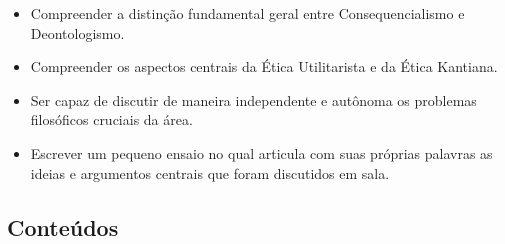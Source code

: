 \documentclass[
	article,			%
	12pt,				%
	twoside,			%
	a4paper,			%
	english,			%
	brazil,				%
	sumario=tradicional
]{plano}
\begin{document}
\begin{itemize}

	\item Compreender a distinção fundamental geral entre Consequencialismo e Deontologismo.
	\item Compreender os aspectos centrais da Ética Utilitarista e da Ética Kantiana.

	\newpage

	\item Ser capaz de discutir de maneira independente e autônoma os problemas filosóficos cruciais da área.

	\item  Escrever um  pequeno ensaio no qual articula com suas próprias palavras as ideias e argumentos centrais que foram discutidos em sala.

\end{itemize}



\begin{snugshade}
	\section{Conteúdos} %
\end{snugshade}
\end{document}
